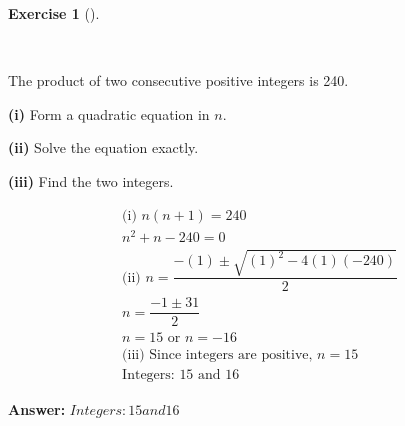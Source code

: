 \documentclass[
  letterpaper,
  DIV=11,
  numbers=noendperiod]{scrreprt}
\theoremstyle{definition}
\newtheorem{exercise}{Exercise}[chapter]
\theoremstyle{remark}
\begin{document}
\begin{exercise}[]\protect\hypertarget{exr-u6-19-3}{}\label{exr-u6-19-3}

~

The product of two consecutive positive integers is 240.

\textbf{(i)} Form a quadratic equation in \(n\).

\textbf{(ii)} Solve the equation exactly.

\textbf{(iii)} Find the two integers.

\begin{tcolorbox}[enhanced jigsaw, opacitybacktitle=0.6, coltitle=black, arc=.35mm, colframe=quarto-callout-tip-color-frame, colback=white, bottomrule=.15mm, left=2mm, colbacktitle=quarto-callout-tip-color!10!white, titlerule=0mm, opacityback=0, title=\textcolor{quarto-callout-tip-color}{\faLightbulb}\hspace{0.5em}{🔍 View Solution}, leftrule=.75mm, breakable, rightrule=.15mm, bottomtitle=1mm, toptitle=1mm, toprule=.15mm]

\begin{align*}
\text{(i) } n(n+1) = 240 \\ n^2 + n - 240 = 0 \\ \text{(ii) } n = \dfrac{-(1) \pm \sqrt{(1)^2 - 4(1)(-240)}}{2} \\ n = \dfrac{-1 \pm 31}{2} \\ n = 15 \text{ or } n = -16 \\ \text{(iii) Since integers are positive, } n = 15 \\ \text{Integers: } 15 \text{ and } 16
\end{align*}

\textbf{Answer:} \(Integers: 15 and 16\)

\end{tcolorbox}

\end{exercise}
\end{document}
